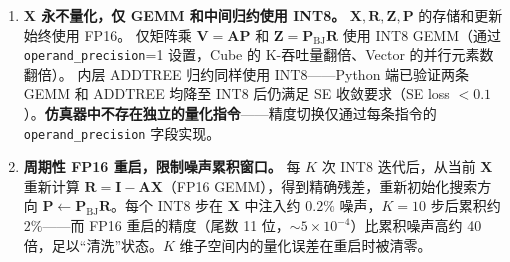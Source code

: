 \documentclass{CjC}
\begin{document}
    \begin{enumerate}
        \item \textbf{$\bm{X}$ 永不量化，仅 GEMM 和中间归约使用 INT8。}
        $\bm{X},\bm{R},\bm{Z},\bm{P}$ 的存储和更新始终使用 FP16。
        仅矩阵乘 $\bm{V}=\bm{A}\bm{P}$ 和 $\bm{Z}=\bm{P}_{\text{BJ}}\bm{R}$ 使用 INT8 GEMM（通过 \texttt{operand\_precision}=1 设置，Cube 的 K-吞吐量翻倍、Vector 的并行元素数翻倍）。
        内层 ADDTREE 归约同样使用 INT8——Python 端已验证两条 GEMM 和 ADDTREE 均降至 INT8 后仍满足 SE 收敛要求（SE loss $<0.1$）。\textbf{仿真器中不存在独立的量化指令}——精度切换仅通过每条指令的 \texttt{operand\_precision} 字段实现。
    
        \item \textbf{周期性 FP16 重启，限制噪声累积窗口。}
        每 $K$ 次 INT8 迭代后，从当前 $\bm{X}$ 重新计算 $\bm{R}=\bm{I}-\bm{A}\bm{X}$（FP16 GEMM），得到精确残差，重新初始化搜索方向 $\bm{P}\leftarrow\bm{P}_{\text{BJ}}\bm{R}$。每个 INT8 步在 $\bm{X}$ 中注入约 $0.2\%$ 噪声，$K=10$ 步后累积约 $2\%$——而 FP16 重启的精度（尾数 11 位，$\sim5\times10^{-4}$）比累积噪声高约 40 倍，足以``清洗''状态。$K$ 维子空间内的量化误差在重启时被清零。
    \end{enumerate}
    
\end{document}
